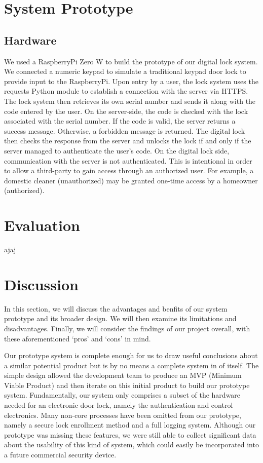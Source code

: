 \documentclass[conference]{IEEEtran}
\begin{document}
\section{System Prototype}
\subsection{Hardware}
	We used a RaspberryPi Zero W to build the prototype of our digital lock system. We connected a numeric keypad to simulate a traditional keypad door lock to provide input to the RaspberryPi. Upon entry by a user, the lock system uses the requests Python module to establish a connection with the server via HTTPS. The lock system then retrieves its own serial number and sends it along with the code entered by the user. On the server-side, the code is checked with the lock associated with the serial number. If the code is valid, the server returns a success message. Otherwise, a forbidden message is returned. The digital lock then checks the response from the server and unlocks the lock if and only if the server managed to authenticate the user’s code. On the digital lock side, communication with the server is not authenticated. This is intentional in order to allow a third-party to gain access through an authorized user. For example, a domestic cleaner (unauthorized) may be granted one-time access by a homeowner (authorized).

\section{Evaluation}
\newpage
ajaj
\newpage
\section{Discussion}
In this section, we will discuss the advantages and benfits of our system prototype and its broader design.
We will then examine its limitations and disadvantages.
Finally, we will consider the findings of our project overall, with these aforementioned `pros' and `cons' in mind.

Our prototype system is complete enough for us to draw useful conclusions about a similar potential product but is by no means a complete system in of itself.
The simple design allowed the development team to produce an MVP (Minimum Viable Product) and then iterate on this initial product to build our prototype system.
Fundamentally, our system only comprises a subset of the hardware needed for an electronic door lock, namely the authentication and control electronics.
Many non-core processes have been omitted from our prototype, namely a secure lock enrollment method and a full logging system.
Although our prototype was missing these features, we were still able to collect significant data about the usability of this kind of system, which could easily be incorporated into a future commercial security device.
\end{document}
